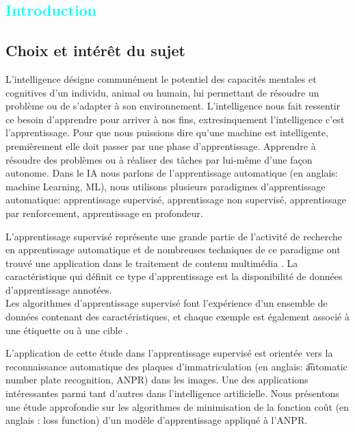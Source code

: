 

\textcolor{cyan}{\chapter{Introduction}}
	\section{Choix et intérêt du sujet}
	
		L’intelligence désigne communément le potentiel des capacités mentales et cognitives d'un individu, animal ou humain, lui permettant de résoudre un problème ou de s'adapter à son environnement. L'intelligence nous fait ressentir ce besoin d’apprendre pour arriver à nos fins, extresinquement l'intelligence c’est l'apprentissage. Pour que nous puissions dire qu’une machine est intelligente, premièrement elle doit passer par une phase d'apprentissage.  Apprendre à résoudre des problèmes ou à réaliser des tâches par lui-même d’une façon autonome. Dans le IA nous parlons de l’apprentissage automatique (en anglais: machine Learning, ML), nous utilisons plusieurs paradigmes d’apprentissage automatique:  apprentissage supervisé, apprentissage non supervisé, apprentissage par renforcement, apprentissage en profondeur.
		
		L'apprentissage supervisé représente une grande partie de l'activité de recherche en apprentissage automatique et de nombreuses techniques de ce paradigme ont trouvé une application dans le traitement de contenu multimédia \cite{cunningham2008supervised}. La caractéristique qui définit ce type d’apprentissage est la disponibilité de données d'apprentissage annotées.\\ Les algorithmes d'apprentissage supervisé font l'expérience d'un ensemble de données contenant des caractéristiques, et chaque exemple est également associé à une étiquette ou à une cible \cite{goodfellow2016deep}. 
		
		L’application de cette étude dans l’apprentissage supervisé est orientée vers la reconnaissance automatique des plaques d’immatriculation (en anglais: \t{automatic number plate recognition, ANPR}) dans les images. Une des applications intéressantes parmi tant d'autres dans l'intelligence artificielle. Nous présentons une étude approfondie sur les algorithmes de minimisation de la fonction coût (en anglais : loss function) d’un modèle d’apprentissage appliqué à l'ANPR. 
		
